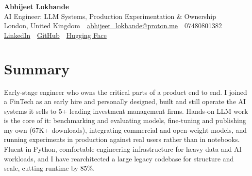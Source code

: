 \documentclass[10pt,a4paper]{article}
\newcommand{\sep}{\,\textcolor{accent!60}{\textbar}\,}
\begin{document}
\begin{center}
  {\fontsize{24}{26}\selectfont\bfseries Abhijeet Lokhande}\\[3pt]
  {\color{accent}\large AI Engineer: LLM Systems, Production Experimentation \& Ownership}\\[5pt]
  {\small
    London, United Kingdom \sep
    \href{mailto:abhijeet_lokhande@proton.me}{abhijeet\_lokhande@proton.me} \sep
    07480801382 \\[2pt]
    \href{https://www.linkedin.com/in/ablds/}{LinkedIn} \sep
    \href{https://github.com/abhijeetscode}{GitHub} \sep
    \href{https://huggingface.co/ab-ai}{Hugging Face}
  }
\end{center}
\vspace{2pt}

\section{Summary}
Early-stage engineer who owns the critical parts of a product end to end. I joined a FinTech as an early hire and personally designed, built and still operate the AI systems it sells to 5+ leading investment management firms. Hands-on LLM work is the core of it: benchmarking and evaluating models, fine-tuning and publishing my own (67K+ downloads), integrating commercial and open-weight models, and running experiments in production against real users rather than in notebooks. Fluent in Python, comfortable engineering infrastructure for heavy data and AI workloads, and I have rearchitected a large legacy codebase for structure and scale, cutting runtime by 85\%.

\end{document}
